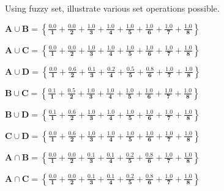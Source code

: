 \documentclass{article}
\begin{document}
\begin{enumerate}
        Using fuzzy set, illustrate various set operations possible.

        $\boldsymbol{A \cup B =
            \left\{
            \frac{0.0}{1} +
            \frac{0.0}{2} +
            \frac{1.0}{3} +
            \frac{1.0}{4} +
            \frac{1.0}{5} +
            \frac{1.0}{6} +
            \frac{1.0}{7} +
            \frac{1.0}{8}
            \right\}}$

        $\boldsymbol{A \cup C =
            \left\{
            \frac{0.0}{1} +
            \frac{0.0}{2} +
            \frac{1.0}{3} +
            \frac{1.0}{4} +
            \frac{1.0}{5} +
            \frac{1.0}{6} +
            \frac{1.0}{7} +
            \frac{1.0}{8}
            \right\}}$

        $\boldsymbol{A \cup D =
            \left\{
            \frac{0.0}{1} +
            \frac{0.6}{2} +
            \frac{0.1}{3} +
            \frac{0.2}{4} +
            \frac{0.5}{5} +
            \frac{0.8}{6} +
            \frac{1.0}{7} +
            \frac{1.0}{8}
            \right\}}$

        $\boldsymbol{B \cup C =
            \left\{
            \frac{0.1}{1} +
            \frac{0.5}{2} +
            \frac{1.0}{3} +
            \frac{1.0}{4} +
            \frac{1.0}{5} +
            \frac{1.0}{6} +
            \frac{1.0}{7} +
            \frac{1.0}{8}
            \right\}}$

        $\boldsymbol{B \cup D =
            \left\{
            \frac{0.1}{1} +
            \frac{0.6}{2} +
            \frac{1.0}{3} +
            \frac{1.0}{4} +
            \frac{1.0}{5} +
            \frac{1.0}{6} +
            \frac{1.0}{7} +
            \frac{1.0}{8}
            \right\}}$

        $\boldsymbol{C \cup D =
            \left\{
            \frac{0.0}{1} +
            \frac{0.6}{2} +
            \frac{1.0}{3} +
            \frac{1.0}{4} +
            \frac{1.0}{5} +
            \frac{1.0}{6} +
            \frac{1.0}{7} +
            \frac{1.0}{8}
            \right\}}$

        $\boldsymbol{A \cap B =
            \left\{
            \frac{0.0}{1} +
            \frac{0.0}{2} +
            \frac{0.1}{3} +
            \frac{0.1}{4} +
            \frac{0.2}{5} +
            \frac{0.8}{6} +
            \frac{1.0}{7} +
            \frac{1.0}{8}
            \right\}}$

        $\boldsymbol{A \cap C =
            \left\{
            \frac{0.0}{1} +
            \frac{0.0}{2} +
            \frac{0.1}{3} +
            \frac{0.1}{4} +
            \frac{0.2}{5} +
            \frac{0.8}{6} +
            \frac{1.0}{7} +
            \frac{1.0}{8}
            \right\}}$


\end{enumerate}
\end{document}
